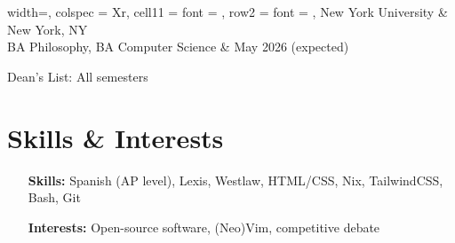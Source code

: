 \documentclass{article}
\begin{document}
\vspace{0.5em}

\begin{tblr}{
    width=\textwidth,
    colspec = {Xr},
    cell{1}{1} = {font = {\bfseries}},
    row{2} = {font = {\itshape}},
  }
  New York University                & New York, NY        \\
  BA Philosophy, BA Computer Science & May 2026 (expected)
\end{tblr}
\begin{compactitem}
  \item
    Dean's List: All semesters
\end{compactitem}

\vspace{0.5em}

\section{Skills \& Interests}
\titlerule

\vspace{0.5em}

\begin{itemize}
  \item[\bfseries Skills:]
    Spanish (AP level), Lexis, Westlaw, HTML/CSS, Nix, TailwindCSS, Bash, Git

  \item[\bfseries Interests:]
    Open-source software, (Neo)Vim, competitive debate
\end{itemize}
\end{document}
